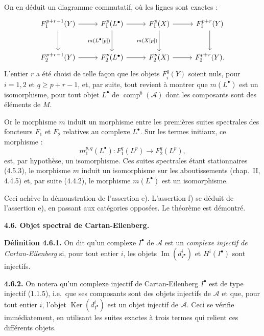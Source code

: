 \clearpage
{}%
\begingroup\small\setlength{\parskip}{0pt}\setlength{\emergencystretch}{1.5em}
\setlength{\abovedisplayskip}{4pt plus 2pt minus 2pt}%
\setlength{\belowdisplayskip}{4pt plus 2pt minus 2pt}%

On en déduit un diagramme commutatif, où les lignes sont exactes :
\[
\begin{tikzcd}[column sep=2.7em,row sep=2.8em]
F_1^{p+r-1}(Y) \arrow[r] \arrow[d] &
F_1^p(L^\bullet) \arrow[r] \arrow[d,"{m(L^\bullet[p])}"'] &
F_1^p(X) \arrow[r] \arrow[d,"{m(X[p])}"'] &
F_1^{p+r}(Y) \arrow[d] \\
F_2^{p+r-1}(Y) \arrow[r] &
F_2^p(L^\bullet) \arrow[r] &
F_2^p(X) \arrow[r] &
F_2^{p+r}(Y).
\end{tikzcd}
\]
L'entier $r$ a été choisi de telle façon que les objets $F_i^q(Y)$ soient
nuls, pour $i=1,2$ et $q\geq p+r-1$, et, par suite, tout revient à montrer
que $m(L^\bullet)$ est un isomorphisme, pour tout objet $L^\bullet$ de
$\operatorname{comp}^{b}(\mathcal A)$ dont les composants sont des éléments
de $M$.

Or le morphisme $m$ induit un morphisme entre les premières suites
spectrales des foncteurs $F_1$ et $F_2$ relatives au complexe $L^\bullet$.
Sur les termes initiaux, ce morphisme :
\[
m_1^{p,q}(L^\bullet)\colon F_1^q(L^p)\longrightarrow F_2^q(L^p),
\]
est, par hypothèse, un isomorphisme. Ces suites spectrales étant
stationnaires (4.5.3), le morphisme $m$ induit un isomorphisme sur les
aboutissements (chap.~II, 4.4.5) et, par suite (4.4.2), le morphisme
$m(L^\bullet)$ est un isomorphisme.

Ceci achève la démonstration de l'assertion e). L'assertion f) se déduit de
l'assertion e), en passant aux catégories opposées. Le théorème est
démontré.

\medskip\noindent\textbf{4.6. Objet spectral de Cartan-Eilenberg.}

\noindent\textbf{Définition 4.6.1.}\quad
On dit qu'un complexe $I^\bullet$ de $\mathcal A$ est un \emph{complexe
injectif de Cartan-Eilenberg} si, pour tout entier $i$, les objets
$\operatorname{Im}(d_{I^\bullet}^{i})$ et $H^i(I^\bullet)$ sont injectifs.

\noindent\textbf{4.6.2.}\quad
On notera qu'un complexe injectif de Cartan-Eilenberg $I^\bullet$ est de
type injectif (1.1.5), i.e.\ que ses composants sont des objets injectifs de
$\mathcal A$ et que, pour tout entier $i$, l'objet
$\operatorname{Ker}(d_{I^\bullet}^{i})$ est un objet injectif de
$\mathcal A$. Ceci se vérifie immédiatement, en utilisant les suites exactes
à trois termes qui relient ces différents objets.

